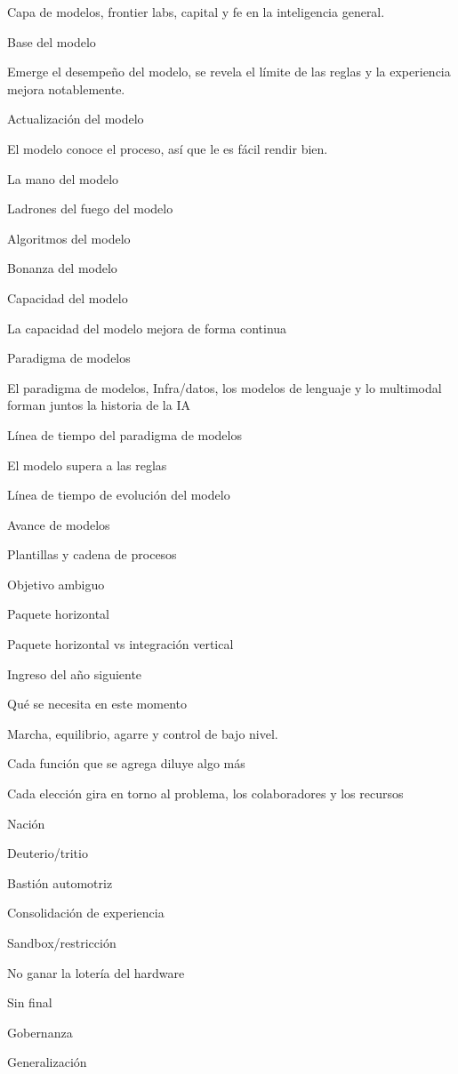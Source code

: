 \documentclass{article}
\begin{document}
Capa de modelos, frontier labs, capital y fe en la inteligencia general.

Base del modelo

Emerge el desempeño del modelo, se revela el límite de las reglas y la experiencia mejora notablemente.

Actualización del modelo

El modelo conoce el proceso, así que le es fácil rendir bien.

La mano del modelo

Ladrones del fuego del modelo

Algoritmos del modelo

Bonanza del modelo

Capacidad del modelo

La capacidad del modelo mejora de forma continua

Paradigma de modelos

El paradigma de modelos, Infra/datos, los modelos de lenguaje y lo multimodal forman juntos la historia de la IA

Línea de tiempo del paradigma de modelos

El modelo supera a las reglas

Línea de tiempo de evolución del modelo

Avance de modelos

Plantillas y cadena de procesos

Objetivo ambiguo

Paquete horizontal

Paquete horizontal vs integración vertical

Ingreso del año siguiente

Qué se necesita en este momento

Marcha, equilibrio, agarre y control de bajo nivel.

Cada función que se agrega diluye algo más

Cada elección gira en torno al problema, los colaboradores y los recursos

Nación

Deuterio/tritio

Bastión automotriz

Consolidación de experiencia

Sandbox/restricción

No ganar la lotería del hardware

Sin final

Gobernanza

Generalización
\end{document}

